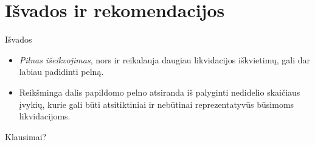 \documentclass[12pt]{beamer}
\begin{document}
\section{Išvados ir rekomendacijos}
\begin{frame}{Išvados}
  \begin{itemize}
    \item \textit{Pilnas išeikvojimas}, nors ir reikalauja daugiau likvidacijos iškvietimų, gali dar labiau padidinti pelną.
    \item Reikšminga dalis papildomo pelno atsiranda iš palyginti nedidelio skaičiaus įvykių, kurie gali būti atsitiktiniai ir nebūtinai reprezentatyvūs būsimoms likvidacijoms.
  \end{itemize}
\end{frame}

\begin{frame}
  \centering
  \Large Klausimai?
\end{frame}
\end{document}
